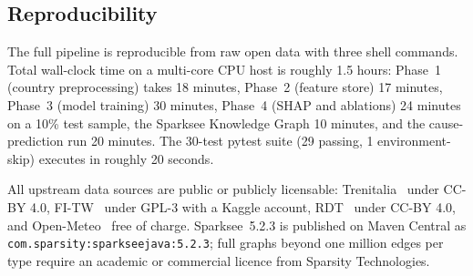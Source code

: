 \subsection{Reproducibility}

The full pipeline is reproducible from raw open data with three shell commands. Total wall-clock time on a multi-core CPU host is roughly 1.5 hours: Phase~1 (country preprocessing) takes 18 minutes, Phase~2 (feature store) 17 minutes, Phase~3 (model training) 30 minutes, Phase~4 (SHAP and ablations) 24 minutes on a 10\% test sample, the Sparksee Knowledge Graph 10 minutes, and the cause-prediction run 20 minutes. The 30-test pytest suite (29 passing, 1 environment-skip) executes in roughly 20 seconds.

All upstream data sources are public or publicly licensable: Trenitalia~\cite{trenitalia2025figshare} under CC-BY 4.0, FI-TW~\cite{borin2025fitw} under GPL-3 with a Kaggle account, RDT~\cite{rdt2024opendata} under CC-BY 4.0, and Open-Meteo~\cite{zippenfenig2023openmeteo} free of charge. Sparksee~5.2.3 is published on Maven Central as \texttt{com.sparsity:sparkseejava:5.2.3}; full graphs beyond one million edges per type require an academic or commercial licence from Sparsity Technologies.
